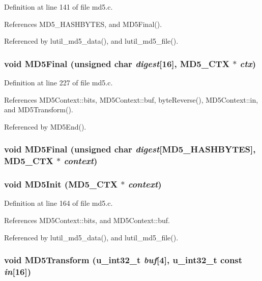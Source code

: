 Definition at line 141 of file md5.c.

References MD5\_\-HASHBYTES, and MD5Final().

Referenced by lutil\_\-md5\_\-data(), and lutil\_\-md5\_\-file().
\subsubsection{\setlength{\rightskip}{0pt plus 5cm}void MD5Final (unsigned char {\em digest}[16], {\bf MD5\_\-CTX} $\ast$ {\em ctx})}\label{md5_8c_a13}




Definition at line 227 of file md5.c.

References MD5Context::bits, MD5Context::buf, byte\-Reverse(), MD5Context::in, and MD5Transform().

Referenced by MD5End().
\subsubsection{\setlength{\rightskip}{0pt plus 5cm}void MD5Final (unsigned char {\em digest}[MD5\_\-HASHBYTES], {\bf MD5\_\-CTX} $\ast$ {\em context})\hspace{0.3cm}{\tt  [static]}}\label{md5_8c_a7}


\subsubsection{\setlength{\rightskip}{0pt plus 5cm}void MD5Init ({\bf MD5\_\-CTX} $\ast$ {\em context})\hspace{0.3cm}{\tt  [static]}}\label{md5_8c_a5}




Definition at line 164 of file md5.c.

References MD5Context::bits, and MD5Context::buf.

Referenced by lutil\_\-md5\_\-data(), and lutil\_\-md5\_\-file().
\subsubsection{\setlength{\rightskip}{0pt plus 5cm}void MD5Transform (u\_\-int32\_\-t {\em buf}[4], u\_\-int32\_\-t const {\em in}[16])\hspace{0.3cm}{\tt  [static]}}\label{md5_8c_a8}




